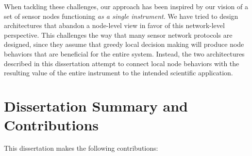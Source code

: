 When tackling these challenges, our approach has been inspired by our vision
of a set of sensor nodes functioning \textit{as a single instrument}. We have
tried to design architectures that abandon a node-level view in favor of this
network-level perspective. This challenges the way that many sensor network
protocols are designed, since they assume that greedy local decision making
will produce node behaviors that are beneficial for the entire system.
Instead, the two architectures described in this dissertation attempt to
connect local node behaviors with the resulting value of the entire
instrument to the intended scientific application.

\section{Dissertation Summary and Contributions}

This dissertation makes the following contributions:

